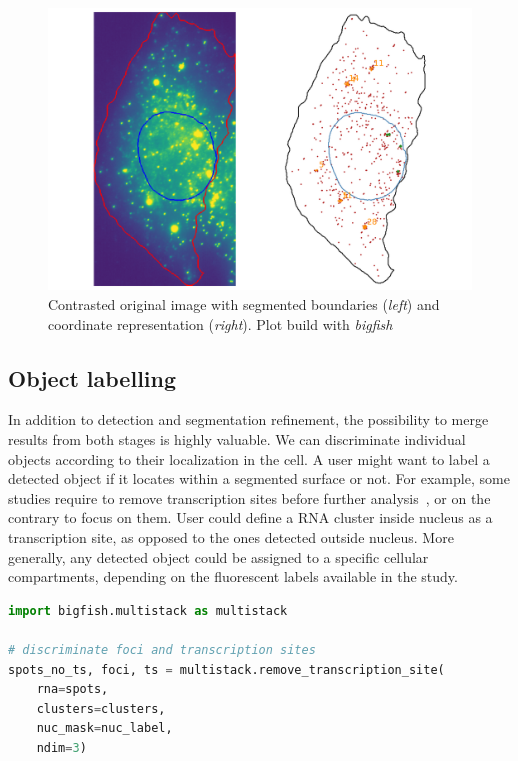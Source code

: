 \begin{figure}[h]
    \centering
    \includegraphics[width=\textwidth]{figures/chapter4/cell_extracted_0}
    \caption{Contrasted original image with segmented boundaries (\textit{left}) and coordinate representation (\textit{right}).
	Plot build with \emph{bigfish}}
    \label{fig:cell_extracted_0}
\end{figure}

\subsection{Object labelling}
\label{subsec:object_labelling}

In addition to detection and segmentation refinement, the possibility to merge results from both stages is highly valuable.
We can discriminate individual objects according to their localization in the cell.
A user might want to label a detected object if it locates within a segmented surface or not.
For example, some studies require to remove transcription sites before further analysis~\cite{CHOUAIB_2020}, or on the contrary to focus on them.
User could define a \ac{RNA} cluster inside nucleus as a transcription site, as opposed to the ones detected outside nucleus.
More generally, any detected object could be assigned to a specific cellular compartments, depending on the fluorescent labels available in the study.\\


\begin{minipage}{0.9\textwidth}
\begin{lstlisting}[language=Python]
import bigfish.multistack as multistack

# discriminate foci and transcription sites
spots_no_ts, foci, ts = multistack.remove_transcription_site(
	rna=spots,
	clusters=clusters,
	nuc_mask=nuc_label,
	ndim=3)
\end{lstlisting}
\end{minipage}

